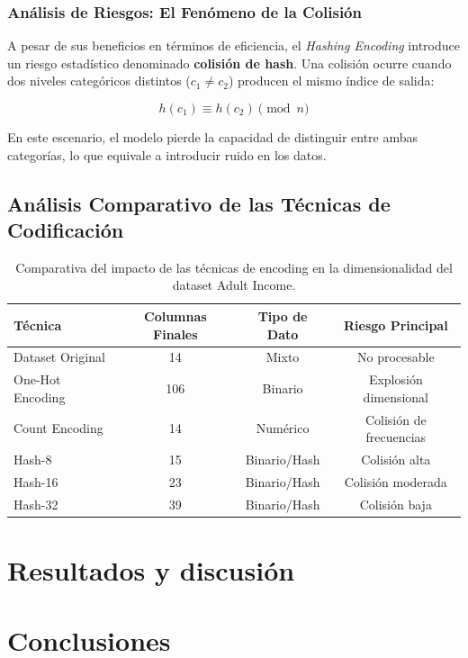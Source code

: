 \documentclass[a4paper,10pt]{book}
\begin{document}
		\subsection{Análisis de Riesgos: El Fenómeno de la Colisión}
			
			A pesar de sus beneficios en términos de eficiencia, el \textit{Hashing Encoding} introduce un riesgo estadístico denominado \textbf{colisión de hash}. Una colisión ocurre cuando dos niveles categóricos distintos ($c_1 \neq c_2$) producen el mismo índice de salida:
			
			\begin{equation}
				h(c_1) \equiv h(c_2) \pmod n
			\end{equation}
			
			En este escenario, el modelo pierde la capacidad de distinguir entre ambas categorías, lo que equivale a introducir ruido en los datos.

	\section{Análisis Comparativo de las Técnicas de Codificación}

		\begin{table}[H]
			\centering
			\begin{tabular}{|l|c|c|c|}
				\hline
				\rowcolor{lightgray} 
				\textbf{Técnica} & \textbf{Columnas Finales} & \textbf{Tipo de Dato} & \textbf{Riesgo Principal} \\ \hline
				Dataset Original & 14 & Mixto & No procesable \\ \hline
				One-Hot Encoding & 106 & Binario & Explosión dimensional \\ \hline
				Count Encoding & 14 & Numérico & Colisión de frecuencias \\ \hline
				Hash-8 & 15 & Binario/Hash & Colisión alta \\ \hline
				Hash-16 & 23 & Binario/Hash & Colisión moderada \\ \hline
				Hash-32 & 39 & Binario/Hash & Colisión baja \\ \hline
			\end{tabular}
			\caption{Comparativa del impacto de las técnicas de encoding en la dimensionalidad del dataset Adult Income.}
			\label{tab:resumen_encoding}
		\end{table}
				

			
			
	

	
	
	

		
	


\chapter{Resultados y discusión}
\label{ch:resultados}


\chapter{Conclusiones}



\end{document}
